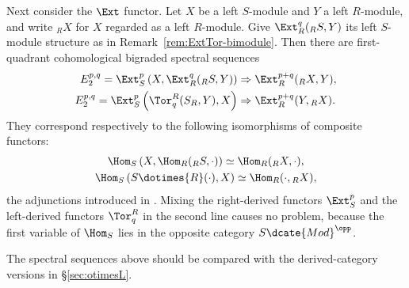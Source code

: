 \begin{example}
	Next consider the $\Ext$ functor. Let $X$ be a left $S$-module and $Y$ a
	left $R$-module, and write ${}_RX$ for $X$ regarded as a left $R$-module.
	Give $\Ext_R^q({}_RS,Y)$ its left $S$-module structure as in
	Remark~\ref{rem:ExtTor-bimodule}. Then there are first-quadrant
	cohomological bigraded spectral sequences
	\begin{align*}
		E_2^{p,q} = \Ext_S^p\left( X, \Ext_R^q({}_R S, Y) \right) & \Rightarrow \Ext_R^{p+q}({}_R X, Y), \\
		E_2^{p,q} = \Ext_S^p\left( \Tor^R_q(S_R, Y), X \right) & \Rightarrow \Ext_R^{p+q}(Y, {}_R X).
	\end{align*}
	They correspond respectively to the following isomorphisms of composite
	functors:
	\begin{gather*}
		\Hom_S\left( X, \Hom_R({}_R S, \cdot) \right) \simeq \Hom_R({}_R X, \cdot), \\
		\Hom_S\left( S \dotimes{R} (\cdot), X \right) \simeq \Hom_R(\cdot, {}_R X),
	\end{gather*}
	the adjunctions introduced in \cite[Corollary 6.6.8]{Li1}. Mixing the
	right-derived functors $\Ext_S^p$ and the left-derived functors
	$\Tor^R_q$ in the second line causes no problem, because the first variable
	of $\Hom_S$ lies in the opposite category $S\dcate{Mod}^{\opp}$.
\end{example}

The spectral sequences above should be compared with the derived-category
versions in \S\ref{sec:otimesL}.

